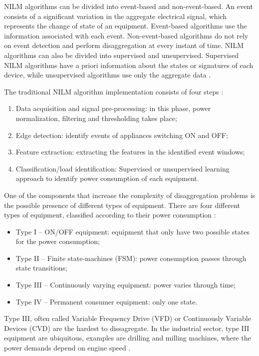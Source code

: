 NILM algorithms can be divided into event-based and non-event-based. An event consists of a significant variation in the aggregate electrical signal, which represents the change of state of an equipment. Event-based algorithms use the information associated with each event. Non-event-based algorithms do not rely on event detection and perform disaggregation at every instant of time.
NILM algorithms can also be divided into supervised and unsupervised. Supervised NILM algorithms have a priori information about the states or signatures of each device, while unsupervised algorithms use only the aggregate data \cite{Application_NILM_Techniques_EnergyManagement_AssistedLiving}.

The traditional NILM algorithm implementation consists of four steps \cite{Overview_NILM_Aproaches}:

\begin{enumerate}
    \item	Data acquisition and signal pre-processing: in this phase, power normalization, filtering and thresholding takes place;
    \item	Edge detection: identify events of appliances switching ON and OFF;
    \item	Feature extraction: extracting the features in the identified event windows;
    \item Classification/load identification: Supervised or unsupervised learning approach to identify power consumption of each equipment.
\end{enumerate}


One of the components that increase the complexity of disaggregation problems is the possible presence of different types of equipment. There are four different types of equipment, classified according to their power consumption \cite{Application_NILM_Techniques_EnergyManagement_AssistedLiving}:
\begin{itemize}
    \item Type I – ON/OFF equipment: equipment that only have two possible states for the power consumption;
    \item Type II – Finite state-machines (FSM): power consumption passes through state transitions;
    \item Type III – Continuously varying equipment: power varies through time;
    \item Type IV – Permanent consumer equipment: only one state.
\end{itemize}

Type III, often called Variable Frequency Drive (VFD) or Continuously Variable Devices (CVD) are the hardest to dissagregate. In the industrial sector, type III equipment are ubiquitous, examples are drilling and milling machines, where the power demands depend on engine speed \cite{Evaluation_NILM_Industrial_Energy-Consumption_Data}.



